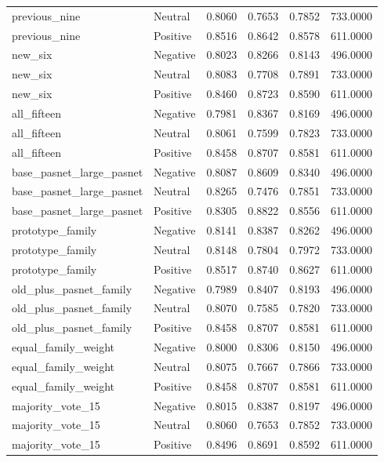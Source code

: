 \begin{tabular}{llrrrr}
previous\_nine & Neutral & 0.8060 & 0.7653 & 0.7852 & 733.0000 \\
previous\_nine & Positive & 0.8516 & 0.8642 & 0.8578 & 611.0000 \\
new\_six & Negative & 0.8023 & 0.8266 & 0.8143 & 496.0000 \\
new\_six & Neutral & 0.8083 & 0.7708 & 0.7891 & 733.0000 \\
new\_six & Positive & 0.8460 & 0.8723 & 0.8590 & 611.0000 \\
all\_fifteen & Negative & 0.7981 & 0.8367 & 0.8169 & 496.0000 \\
all\_fifteen & Neutral & 0.8061 & 0.7599 & 0.7823 & 733.0000 \\
all\_fifteen & Positive & 0.8458 & 0.8707 & 0.8581 & 611.0000 \\
base\_pasnet\_large\_pasnet & Negative & 0.8087 & 0.8609 & 0.8340 & 496.0000 \\
base\_pasnet\_large\_pasnet & Neutral & 0.8265 & 0.7476 & 0.7851 & 733.0000 \\
base\_pasnet\_large\_pasnet & Positive & 0.8305 & 0.8822 & 0.8556 & 611.0000 \\
prototype\_family & Negative & 0.8141 & 0.8387 & 0.8262 & 496.0000 \\
prototype\_family & Neutral & 0.8148 & 0.7804 & 0.7972 & 733.0000 \\
prototype\_family & Positive & 0.8517 & 0.8740 & 0.8627 & 611.0000 \\
old\_plus\_pasnet\_family & Negative & 0.7989 & 0.8407 & 0.8193 & 496.0000 \\
old\_plus\_pasnet\_family & Neutral & 0.8070 & 0.7585 & 0.7820 & 733.0000 \\
old\_plus\_pasnet\_family & Positive & 0.8458 & 0.8707 & 0.8581 & 611.0000 \\
equal\_family\_weight & Negative & 0.8000 & 0.8306 & 0.8150 & 496.0000 \\
equal\_family\_weight & Neutral & 0.8075 & 0.7667 & 0.7866 & 733.0000 \\
equal\_family\_weight & Positive & 0.8458 & 0.8707 & 0.8581 & 611.0000 \\
majority\_vote\_15 & Negative & 0.8015 & 0.8387 & 0.8197 & 496.0000 \\
majority\_vote\_15 & Neutral & 0.8060 & 0.7653 & 0.7852 & 733.0000 \\
majority\_vote\_15 & Positive & 0.8496 & 0.8691 & 0.8592 & 611.0000 \\
\bottomrule
\end{tabular}
